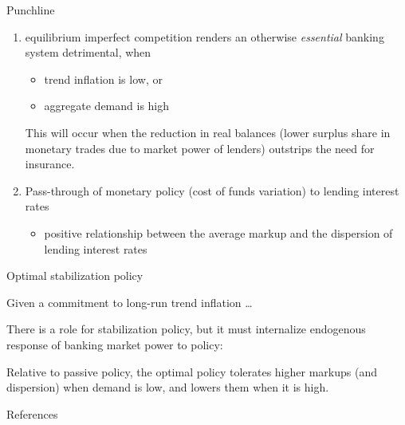 \documentclass[10pt,english,slidetop,compress,
              blue,mathserif,color=option]{beamer}
\theoremstyle{plain}
\theoremstyle{definition}
\begin{document}
\begin{frame}[allowframebreaks]{Punchline}
    \begin{enumerate}
        \item equilibrium imperfect competition renders an otherwise \emph{essential} banking system detrimental, when 
        \begin{itemize}
                \item trend inflation is low, or
                \item aggregate demand is high
        \end{itemize}
        This will occur when the reduction in real balances (lower surplus share in monetary trades due to market power of lenders) outstrips the need for insurance.

        \item Pass-through of monetary policy (cost of funds variation) to lending interest rates

        \begin{itemize}
            \item positive relationship between the average markup and the dispersion of lending interest rates
        \end{itemize}
    \end{enumerate}

    \break


    \alert{Optimal stabilization policy}

    \bigskip

    Given a commitment to long-run trend inflation \dots

    \bigskip

    There is a role for stabilization policy, but it must internalize endogenous response of banking market power to policy:
    \bigskip

    Relative to passive policy, the optimal policy tolerates higher markups (and dispersion) when demand is low, and lowers them when it is high.

    



\end{frame}






\begin{frame}[allowframebreaks]{References}
  \begin{tiny}
    \printbibliography
  \end{tiny}
\end{frame}





\end{document}
